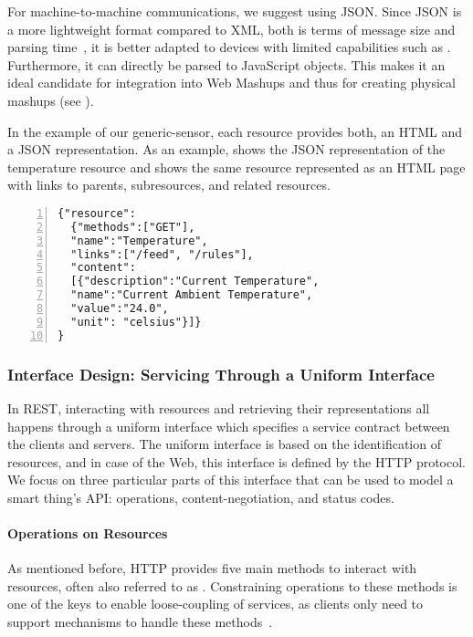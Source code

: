 For machine-to-machine communications, we suggest using JSON. Since JSON is a more lightweight format compared to XML, both is terms of message size and parsing time~\cite{Xu2009}, it is better adapted to devices with limited capabilities such as \sts{}. Furthermore, it can directly be parsed to JavaScript objects. This makes it an ideal candidate for integration into Web Mashups and thus for creating physical mashups (see ).

In the example of our generic-sensor, each resource provides both, an HTML and a JSON representation. As an example,  shows the JSON representation of the temperature resource and  shows the same resource represented as an HTML page with links to parents, subresources, and related resources.


\begin{lstlisting}[caption=JSON representation of the temperature resource of a generic node, label=lst:JSONRepresentation, breaklines, numbers=left, numberstyle=\tiny, language={}, xleftmargin=0.8cm, basicstyle=\small\ttfamily, backgroundcolor=\color{gray}, captionpos=b]
{"resource":
  {"methods":["GET"],
  "name":"Temperature",
  "links":["/feed", "/rules"],
  "content":
  [{"description":"Current Temperature",
  "name":"Current Ambient Temperature",
  "value":"24.0",
  "unit": "celsius"}]}
}
\end{lstlisting}

\subsubsection{Interface Design: Servicing Through a Uniform Interface}\label{interfaceDesign}
In REST, interacting with resources and retrieving their representations all happens through a uniform interface which specifies a service contract between the clients and servers. The uniform interface is based on the identification of resources, and in case of the Web, this interface is defined by the HTTP protocol. We focus on three particular parts of this interface that can be used to model a smart thing's API: operations, content-negotiation, and status codes.

\paragraph{Operations on Resources}
As mentioned before, HTTP provides five main methods to interact with resources, often also referred to as . Constraining operations to these methods is one of the keys to enable loose-coupling of services, as clients only need to support mechanisms to handle these methods~\cite{Pautasso2009}.

